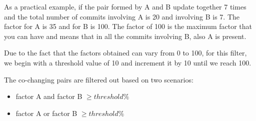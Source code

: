 As a practical example, if the pair formed by A and B update together 7 times and the total number of commits involving A is 20 and involving B is 7. The factor for A is 35 and for B is 100. The factor of 100 is the maximum factor that you can have and means that in all the commits involving B, also A is present.

Due to the fact that the factors obtained can vary from 0 to 100, for this filter, we begin with a threshold value of 10 and increment it by 10 until we reach 100. 

The co-changing pairs are filtered out based on two scenarios:
\begin{itemize}
	\item factor A and factor B $\geq threshold \%$ 
	\item factor A or factor B $\geq threshold \%$ 
\end{itemize}

